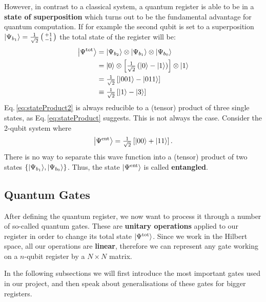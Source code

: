 \documentclass[bibliography=totocnumbered, 10pt]{article}
\theoremstyle{NoticeStyle}
\begin{document}
However, in contrast to a classical system, a quantum register is able to be in a \textbf{state of superposition} which turns out to be the fundamental advantage for quantum computation. If for example the second qubit is set to a superposition ${\left\vert{\Psi_{b_1}}\right\rangle}=\tfrac{1}{\sqrt{2}}\left(\begin{smallmatrix}
+1\\-1
\end{smallmatrix}\right)$ the total state of the register will be:
%
\begin{align}
	{\left\vert{\Psi^\text{tot}}\right\rangle} &= {\left\vert{\Psi_{b_2}}\right\rangle} \otimes {\left\vert{\Psi_{b_1}}\right\rangle} \otimes {\left\vert{\Psi_{b_0}}\right\rangle}\label{eq:stateProduct}\\
			   &= {\left\vert{0}\right\rangle} \otimes \left[ \tfrac{1}{\sqrt{2}} \left({\left\vert{0}\right\rangle} - {\left\vert{1}\right\rangle}\right) \right] \otimes {\left\vert{1}\right\rangle}\\
			   &= \tfrac{1}{\sqrt{2}} \left[ {\left\vert{001}\right\rangle} - {\left\vert{011}\right\rangle}   \right]\\
			   &\equiv \tfrac{1}{\sqrt{2}} \left[ {\left\vert{1}\right\rangle} - {\left\vert{3}\right\rangle}   \right]\label{eq:stateProduct2}
\end{align} 
%
Eq.\,\ref{eq:stateProduct2} is always reducible to a (tensor) product of three single states, as Eq.\,\ref{eq:stateProduct} suggests. This is not always the case. Consider the 2-qubit system where
%
\begin{align}
	{\left\vert{\Psi^\text{ent}}\right\rangle} = \tfrac{1}{\sqrt{2}}  \left[ {\left\vert{00}\right\rangle} + {\left\vert{11}\right\rangle} \right]. \label{eq:entangled}
\end{align}
%
There is no way to separate this wave function into a (tensor) product of two states
$\{ {\left\vert{\Psi_{b_1}}\right\rangle}, {\left\vert{\Psi_{b_0}}\right\rangle} \}$. Thus, the state ${\left\vert{\Psi^\text{ent}}\right\rangle}$ is called \textbf{entangled}.

\subsection{Quantum Gates}\label{sec:Quantum gates}
After defining the quantum register, we now want to process it through a number of so-called quantum gates. These are \textbf{unitary operations} applied to our register in order to change its total state ${\left\vert{\Psi^\text{tot}}\right\rangle}$. Since we work in the Hilbert space, all our operations are \textbf{linear}, therefore we can represent any gate working on a $n$-qubit register by a $N \times N$ matrix.

In the following subsections we will first introduce the most important gates used in our project, and then speak about generalisations of these gates for bigger registers.
\end{document}
